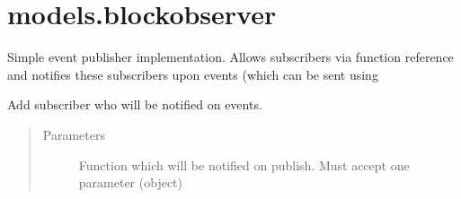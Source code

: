 \documentclass[letterpaper,10pt,english]{sphinxmanual}
\begin{document}
\chapter{models.blockobserver}
\label{\detokenize{models/blockobserver:module-models.blockobserver}}\label{\detokenize{models/blockobserver:models-blockobserver}}\label{\detokenize{models/blockobserver::doc}}

\begin{fulllineitems}
\label{\detokenize{models/blockobserver:models.blockobserver.SimpleEventPublisher}}
\sphinxAtStartPar
Simple event publisher implementation. Allows subscribers via function reference and notifies these subscribers
upon events (which can be sent using

\sphinxAtStartPar
{\hyperref[\detokenize{models/blockobserver:models.blockobserver.SimpleEventPublisher.publish}]{}}

\sphinxAtStartPar
{\hyperref[\detokenize{models/blockobserver:models.blockobserver.SimpleEventPublisher.add_subscriber}]{}}

\begin{fulllineitems}
\label{\detokenize{models/blockobserver:models.blockobserver.SimpleEventPublisher.add_subscriber}}
\sphinxAtStartPar
Add subscriber who will be notified on events.
\begin{quote}\begin{description}
\item[{Parameters}] \leavevmode
\sphinxAtStartPar
{} \textendash{} Function which will be notified on publish. Must accept one parameter (object)


\end{description}
\end{quote}
\end{fulllineitems}
\end{fulllineitems}
\end{document}
